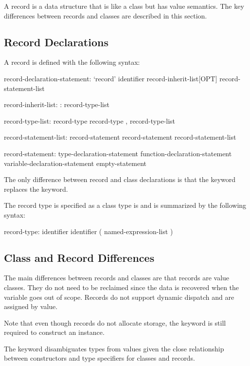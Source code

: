\label{Records}

A record is a data structure that is like a class but has value
semantics.  The key differences between records and classes are
described in this section.

\subsection{Record Declarations}
\label{Record_Declarations}

A record is defined with the following syntax:
\begin{syntax}
record-declaration-statement:
  `record' identifier record-inherit-list[OPT] {
    record-statement-list }

record-inherit-list:
  : record-type-list

record-type-list:
  record-type
  record-type , record-type-list

record-statement-list:
  record-statement
  record-statement record-statement-list

record-statement:
  type-declaration-statement
  function-declaration-statement
  variable-declaration-statement
  empty-statement
\end{syntax}
The only difference between record and class declarations is that
the  keyword replaces the  keyword.

The record type is specified as a class type is and is summarized by
the following syntax:
\begin{syntax}
record-type:
  identifier
  identifier ( named-expression-list )
\end{syntax}

\subsection{Class and Record Differences}
\label{Class_and_Record_Differences}

The main differences between records and classes are that records are
value classes.  They do not need to be reclaimed since the data is
recovered when the variable goes out of scope.  Records do not support
dynamic dispatch and are assigned by value.

Note that even though records do not allocate storage, the 
keyword is still required to construct an instance.
\begin{rationale}
The  keyword disambiguates types from values given the close
relationship between constructors and type specifiers for classes and
records.
\end{rationale}

